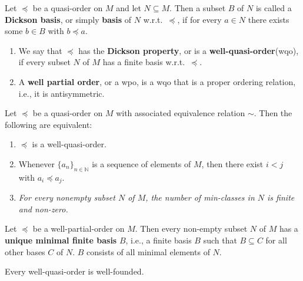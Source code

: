 \begin{definition}\label{def:wqo}
    Let $\preceq$ be a quasi-order on $M$ and let $N \subseteq M$. 
    Then a subset $B$ of $N$ is called a \textbf{Dickson basis}, or simply \textbf{basis} of $N$ w.r.t.\ $\preceq$, if for every $a \in N$ there exists some $b \in B$ with $b \preceq a$.
    \begin{enumerate}
        \item We say that $\preceq$ has the \textbf{Dickson property}, or is a \textbf{well-quasi-order}(wqo), if every subset $N$ of $M$ has a finite basis w.r.t.\ $\preceq$.
        \item A \textbf{well partial order}, or a wpo, is a wqo that is a proper ordering relation, i.e., it is antisymmetric.
    \end{enumerate}
\end{definition}
    
\begin{proposition}\label{prop:wqoEquivalent} %
    Let $\preceq$ be a quasi-order on $M$ with associated equivalence relation $\sim$. 
    Then the following are equivalent:
    \begin{enumerate}
        \item $\preceq$ is a well-quasi-order.
        \item Whenever $\{a_n\}_{n \in \mathbb{N}}$ is a sequence of elements of $M$, then there exist $i < j$ with $a_i \preceq a_j$.
        \item \textit{For every nonempty subset $N$ of $M$, the number of min-classes in $N$ is finite and non-zero.}
    \end{enumerate}
\end{proposition}
    
\begin{corollary}\label{cor:MinimalFiniteBasis} %
    Let $\preceq$ be a well-partial-order on $M$.
    Then every non-empty subset $N$ of $M$ has a \textup{\textbf{unique minimal finite basis}} $B$, i.e., a finite basis $B$ such that $B \subseteq C$ for all other bases $C$ of $N$. 
    $B$ consists of all minimal elements of $N$.
\end{corollary}
    
\begin{corollary}\label{cor:wqo_is_wellFounded} %
    Every well-quasi-order is well-founded.
\end{corollary}
    
